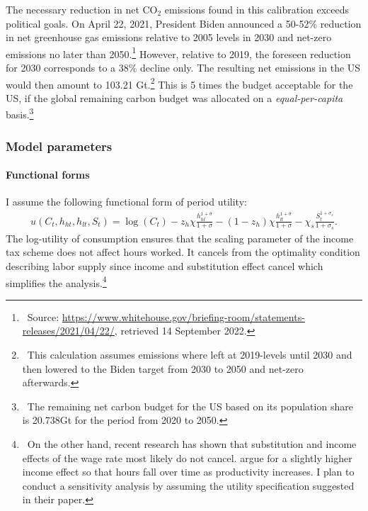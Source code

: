 The necessary reduction in net CO$_2$ emissions found in this calibration exceeds political goals. On April 22, 2021, President Biden announced a 50-52\% reduction in net greenhouse gas emissions relative to 2005 levels in 2030 %
and net-zero emissions no later than 2050.\footnote{\ Source: \href{https://www.whitehouse.gov/briefing-room/statements-releases/2021/04/22/fact-sheet-president-biden-sets-2030-greenhouse-gas-pollution-reduction-target-aimed-at-creating-good-paying-union-jobs-and-securing-u-s-leadership-on-clean-energy-technologies/}{https://www.whitehouse.gov/briefing-room/statements-releases/2021/04/22/}, retrieved 14 September 2022.} 
However, relative to 2019, the foreseen reduction for 2030 corresponds to a 38\% decline only.
The resulting net emissions in the US would then amount to 103.21 Gt.\footnote{\ This calculation assumes emissions where left at 2019-levels until 2030 and then lowered to the Biden target from 2030 to 2050 and net-zero afterwards.} This is 5 times the budget acceptable for the US,  if the global remaining carbon budget was allocated on a \textit{equal-per-capita} basis.\footnote{\ The remaining net carbon budget for the US based on its population share is 20.738Gt for the period from 2020 to 2050.} %

\subsubsection{Model parameters}\label{sec:modpar}

\paragraph{Functional forms}
 I assume the following functional form of period utility:
\begin{align*}
u(C_t,h_{ht}, h_{lt}, S_t )= \log(C_t)-z_h\chi\frac{h_{ht}^{1+\sigma}}{{1+\sigma}}-(1-z_h)\chi\frac{h_{lt}^{1+\sigma}}{{1+\sigma}}-\chi_s\frac{S_t^{1+\sigma_s}}{1+\sigma_s}.
\end{align*}
 The log-utility of consumption ensures that the scaling parameter of the income tax scheme does not affect hours worked. It cancels from the optimality condition describing labor supply since income and substitution effect cancel which simplifies the analysis.\footnote{\  On the other hand, recent research has shown that substitution and income effects of the wage rate most likely do not cancel. \cite{Boppart2019LaborPerspectiveb} argue for a slightly higher income effect so that hours fall over time as productivity increases. I plan to conduct a sensitivity analysis by assuming the utility specification suggested in their paper.}

